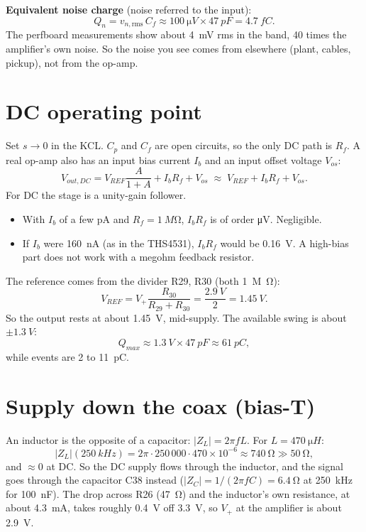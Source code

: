 \documentclass[11pt,a4paper]{article}
\begin{document}
\textbf{Equivalent noise charge} (noise referred to the input):
\[
Q_n=v_{n,\mathrm{rms}}\,C_f\approx\SI{100}{\micro V}\times\SI{47}{pF}=\SI{4.7}{fC}.
\]
The perfboard measurements show about \SI{4}{mV} rms in the band, 40 times the amplifier's own noise. So the noise you see comes from elsewhere (plant, cables, pickup), not from the op-amp.

\section{DC operating point}

Set $s\to0$ in the KCL. $C_p$ and $C_f$ are open circuits, so the only DC path is $R_f$. A real op-amp also has an input bias current $I_b$ and an input offset voltage $V_{os}$:
\[
V_{out,DC}=V_{REF}\frac{A}{1+A}+I_bR_f+V_{os}\;\approx\;V_{REF}+I_bR_f+V_{os}.
\]
For DC the stage is a unity-gain follower.

\begin{itemize}
\item With $I_b$ of a few pA and $R_f=\SI{1}{M\ohm}$, $I_bR_f$ is of order \si{\micro V}. Negligible.
\item If $I_b$ were \SI{160}{nA} (as in the THS4531), $I_bR_f$ would be \SI{0.16}{V}. A high-bias part does not work with a megohm feedback resistor.
\end{itemize}

The reference comes from the divider R29, R30 (both \SI{1}{M\ohm}):
\[
V_{REF}=V_+\frac{R_{30}}{R_{29}+R_{30}}=\frac{\SI{2.9}{V}}{2}=\SI{1.45}{V}.
\]
So the output rests at about \SI{1.45}{V}, mid-supply. The available swing is about $\pm\SI{1.3}{V}$:
\[
Q_{max}\approx\SI{1.3}{V}\times\SI{47}{pF}\approx\SI{61}{pC},
\]
while events are 2 to \SI{11}{pC}.

\section{Supply down the coax (bias-T)}

An inductor is the opposite of a capacitor: $|Z_L|=2\pi fL$. For $L=\SI{470}{\micro H}$:
\[
|Z_L|(\SI{250}{kHz})=2\pi\cdot250\,000\cdot470\times10^{-6}\approx\SI{740}{\ohm}\gg\SI{50}{\ohm},
\]
and $\approx0$ at DC. So the DC supply flows through the inductor, and the signal goes through the capacitor C38 instead ($|Z_C|=1/(2\pi fC)=\SI{6.4}{\ohm}$ at \SI{250}{kHz} for \SI{100}{nF}). The drop across R26 (\SI{47}{\ohm}) and the inductor's own resistance, at about \SI{4.3}{mA}, takes roughly \SI{0.4}{V} off \SI{3.3}{V}, so $V_+$ at the amplifier is about \SI{2.9}{V}.
\end{document}
